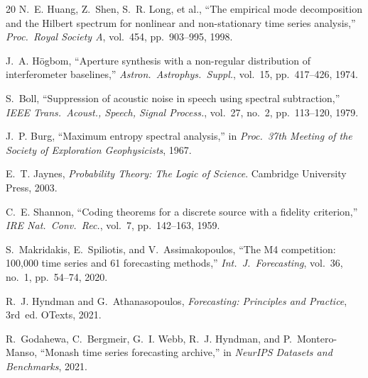 \documentclass[sigconf,nonacm]{acmart}
\begin{document}
\begin{thebibliography}{20}
N.~E. Huang, Z.~Shen, S.~R. Long, et al., ``The empirical mode decomposition and the Hilbert spectrum for nonlinear and non-stationary time series analysis,'' \emph{Proc.\ Royal Society A}, vol.~454, pp.~903--995, 1998.

J.~A. H\"{o}gbom, ``Aperture synthesis with a non-regular distribution of interferometer baselines,'' \emph{Astron.\ Astrophys.\ Suppl.}, vol.~15, pp.~417--426, 1974.

S.~Boll, ``Suppression of acoustic noise in speech using spectral subtraction,'' \emph{IEEE Trans.\ Acoust., Speech, Signal Process.}, vol.~27, no.~2, pp.~113--120, 1979.

J.~P. Burg, ``Maximum entropy spectral analysis,'' in \emph{Proc.\ 37th Meeting of the Society of Exploration Geophysicists}, 1967.

E.~T. Jaynes, \emph{Probability Theory: The Logic of Science}. Cambridge University Press, 2003.

C.~E. Shannon, ``Coding theorems for a discrete source with a fidelity criterion,'' \emph{IRE Nat.\ Conv.\ Rec.}, vol.~7, pp.~142--163, 1959.

S.~Makridakis, E.~Spiliotis, and V.~Assimakopoulos, ``The M4 competition: 100,000 time series and 61 forecasting methods,'' \emph{Int.\ J.\ Forecasting}, vol.~36, no.~1, pp.~54--74, 2020.

R.~J. Hyndman and G.~Athanasopoulos, \emph{Forecasting: Principles and Practice}, 3rd~ed. OTexts, 2021.

R.~Godahewa, C.~Bergmeir, G.~I. Webb, R.~J. Hyndman, and P.~Montero-Manso, ``Monash time series forecasting archive,'' in \emph{NeurIPS Datasets and Benchmarks}, 2021.

\end{thebibliography}
\end{document}
